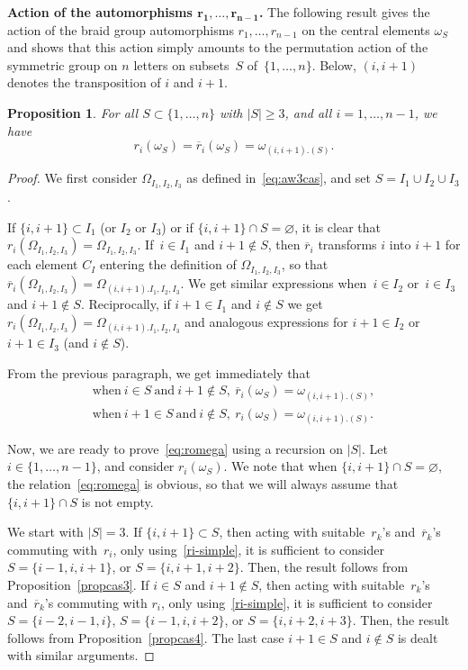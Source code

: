 \documentclass[pdftex]{sigma}
\numberwithin{equation}{section}
\newtheorem{prop}[theo]{Proposition}
\theoremstyle{definition}
\newcommand{\rb}{\overline{r}}
\begin{document}
{\bf Action of the automorphisms $\boldsymbol{r_1,\ldots,r_{n-1}}$.} The following result gives the action of the braid group automorphisms $r_1,\dots,r_{n-1}$ on the central elements $\omega_S$ and shows that this action simply amounts to the permutation action of the symmetric group on $n$ letters on subsets~$S$ of~$\{1,\dots,n\}$. Below, $(i,i+1)$ denotes the transposition of $i$ and $i+1$.

\begin{prop}\label{prop:romega}
For all $S\subset \{1,\dots,n\}$ with $|S|\geq 3$, and all $i=1,\dots,n-1$, we have
\begin{equation}\label{eq:romega}
r_i(\omega_S)=\rb_i(\omega_S)=\omega_{(i,i+1).(S)}.
\end{equation}
\end{prop}
\begin{proof}
We first consider $\varOmega_{I_1,I_2,I_3}$ as defined in~\eqref{eq:aw3cas}, and set $S=I_1\cup I_2\cup I_3$.

If $\{i,i+1\}\subset I_1$ (or $I_2$ or $I_3$) or if $\{i,i+1\}\cap S=\varnothing$, it is clear that $r_i(\varOmega_{I_1,I_2,I_3})=\varOmega_{I_1,I_2,I_3}$.
If~$i\in I_1$ and $i+1\not\in S$, then $\rb_i$ transforms $i$ into $i+1$ for each element $C_I$ entering the definition of
$\varOmega_{I_1,I_2,I_3}$, so that $\rb_i(\varOmega_{I_1,I_2,I_3})=\varOmega_{(i,i+1).I_1,I_2,I_3}$.
We get similar expressions when~$i\in I_2$ or~$i\in I_3$ and $i+1\not\in S$.
Reciprocally, if $i+1\in I_1$ and $i\not\in S$ we get $r_i(\varOmega_{I_1,I_2,I_3})=\varOmega_{(i,i+1).I_1,I_2,I_3}$ and analogous expressions for
$i+1\in I_2$ or $i+1\in I_3$ (and $i\not\in S$).

From the previous paragraph, we get immediately that
\begin{gather}
\text{when}\ i\in S \ \text{and} \ i+1\not\in S,\ \rb_i(\omega_S)=\omega_{(i,i+1).(S)}, \nonumber\\
\text{when}\ i+1\in S \ \text{and} \ i\not\in S,\ r_i(\omega_S)=\omega_{(i,i+1).(S)}.\label{ri-simple}
\end{gather}

Now, we are ready to prove~\eqref{eq:romega} using a recursion on $|S|$. Let $i\in\{1,\dots, n-1\}$, and consider $r_i(\omega_S)$.
We note that when $\{i,i+1\}\cap S=\varnothing$, the relation~\eqref{eq:romega} is obvious, so that we will always assume that $\{i,i+1\}\cap S$ is not empty.

We start with $|S|=3$. If $\{i,i+1\}\subset S$, then acting with suitable~$r_k$'s and~$\rb_k$'s commuting with~$r_i$, only using~\eqref{ri-simple}, it is sufficient to consider $S=\{i-1,i,i+1\}$, or $S=\{i,i+1,i+2\}$. Then, the result follows from Proposition~\ref{propcas3}.
If $i\in S$ and $i+1\not\in S$, then acting with suitable~$r_k$'s and~$\rb_k$'s commuting with $r_i$, only using~\eqref{ri-simple}, it is sufficient to consider $S=\{i-2,i-1,i\}$, $S=\{i-1,i,i+2\}$, or $S=\{i,i+2,i+3\}$. Then, the result follows from Proposition~\ref{propcas4}. The last case $i+1\in S$ and $i\not\in S$ is dealt with similar arguments.


\end{proof}
\end{document}

